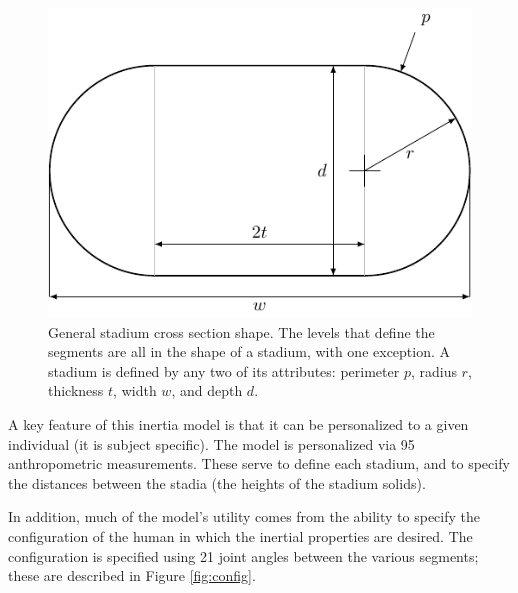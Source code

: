 \documentclass[10pt,a4paper,twocolumn]{article}
\begin{document}
\begin{figure}
  \begin{center}
    \includegraphics[width=\columnwidth]{figures/stadium.pdf}
  \end{center}
  \caption{
    General stadium cross section shape. The levels that define the segments are
    all in the shape of a stadium, with one exception. A stadium
    is defined by any two of its attributes: perimeter $p$, radius $r$, thickness $t$,
    width $w$, and depth $d$.
  }
  \label{fig:stadium}
\end{figure}

A key feature of this inertia model is that it can be personalized to a given
individual (it is subject specific). The model is personalized via 95
anthropometric measurements. These serve to define each stadium,
and to specify the distances between the stadia (the heights of the stadium
solids). 

In addition, much of the model's utility comes from the ability to specify the
configuration of the human in which the inertial properties are desired. The
configuration is specified using 21 joint angles between the various segments; these are described in Figure \ref{fig:config}.
\end{document}
